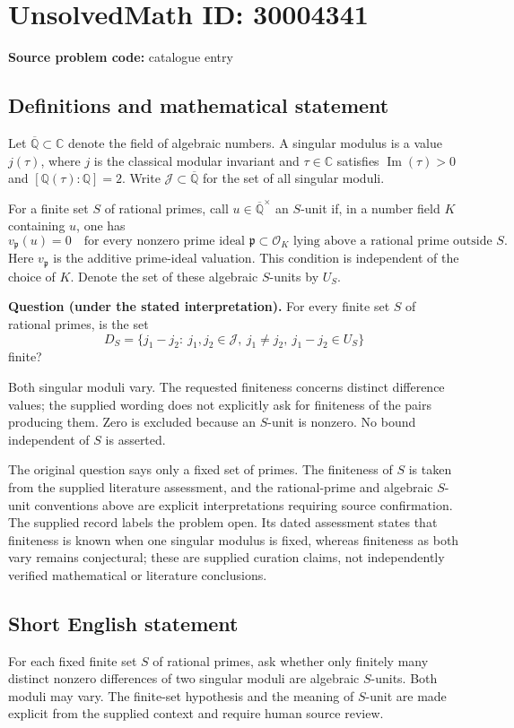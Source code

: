 \documentclass[11pt]{article}
\newcommand{\Q}{\mathbb{Q}}
\newcommand{\C}{\mathbb{C}}
\begin{document}
\section*{UnsolvedMath ID: 30004341}
\textbf{Source problem code:} catalogue entry
\subsection{Definitions and mathematical statement}
Let \(\overline{\Q}\subset\C\) denote the field of algebraic numbers. A singular modulus is a value \(j(\tau)\), where \(j\) is the classical modular invariant and \(\tau\in\C\) satisfies \(\operatorname{Im}(\tau)>0\) and \([\Q(\tau):\Q]=2\). Write \(\mathcal J\subset\overline{\Q}\) for the set of all singular moduli.

For a finite set \(S\) of rational primes, call \(u\in\overline{\Q}^{\times}\) an \(S\)-unit if, in a number field \(K\) containing \(u\), one has
\[
 v_{\mathfrak p}(u)=0
 \quad\text{for every nonzero prime ideal }\mathfrak p\subset\mathcal O_K
 \text{ lying above a rational prime outside }S.
\]
Here \(v_{\mathfrak p}\) is the additive prime-ideal valuation. This condition is independent of the choice of \(K\). Denote the set of these algebraic \(S\)-units by \(U_S\).

\textbf{Question (under the stated interpretation).} For every finite set \(S\) of rational primes, is the set
\[
 D_S=\{j_1-j_2:\ j_1,j_2\in\mathcal J,\ j_1\ne j_2,\ j_1-j_2\in U_S\}
\]
finite?

Both singular moduli vary. The requested finiteness concerns distinct difference values; the supplied wording does not explicitly ask for finiteness of the pairs producing them. Zero is excluded because an \(S\)-unit is nonzero. No bound independent of \(S\) is asserted.

The original question says only a fixed set of primes. The finiteness of \(S\) is taken from the supplied literature assessment, and the rational-prime and algebraic \(S\)-unit conventions above are explicit interpretations requiring source confirmation. The supplied record labels the problem open. Its dated assessment states that finiteness is known when one singular modulus is fixed, whereas finiteness as both vary remains conjectural; these are supplied curation claims, not independently verified mathematical or literature conclusions.
\subsection{Short English statement}
For each fixed finite set \(S\) of rational primes, ask whether only finitely many distinct nonzero differences of two singular moduli are algebraic \(S\)-units. Both moduli may vary. The finite-set hypothesis and the meaning of \(S\)-unit are made explicit from the supplied context and require human source review.
\end{document}
